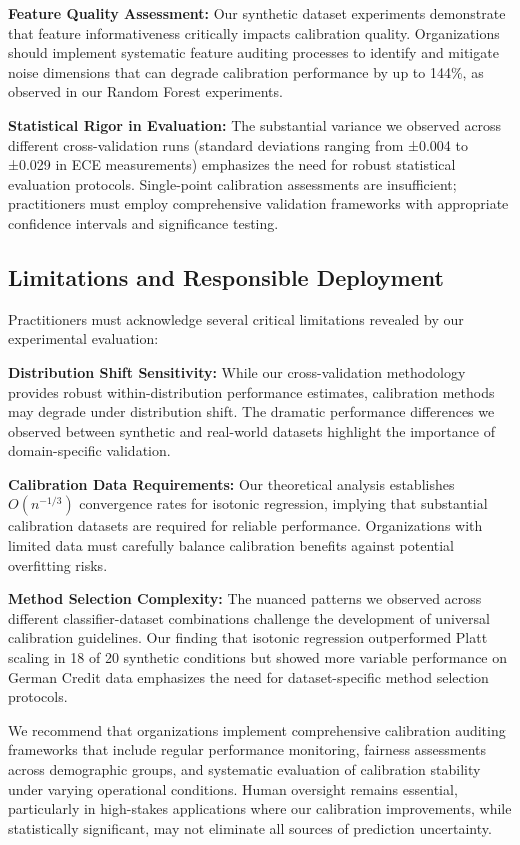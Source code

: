 \documentclass[12pt, a4paper]{article}
\begin{document}
\textbf{Feature Quality Assessment:} Our synthetic dataset experiments demonstrate that feature informativeness critically impacts calibration quality. Organizations should implement systematic feature auditing processes to identify and mitigate noise dimensions that can degrade calibration performance by up to 144\%, as observed in our Random Forest experiments.

\textbf{Statistical Rigor in Evaluation:} The substantial variance we observed across different cross-validation runs (standard deviations ranging from ±0.004 to ±0.029 in ECE measurements) emphasizes the need for robust statistical evaluation protocols. Single-point calibration assessments are insufficient; practitioners must employ comprehensive validation frameworks with appropriate confidence intervals and significance testing.

\subsection{Limitations and Responsible Deployment}

Practitioners must acknowledge several critical limitations revealed by our experimental evaluation:

\textbf{Distribution Shift Sensitivity:} While our cross-validation methodology provides robust within-distribution performance estimates, calibration methods may degrade under distribution shift. The dramatic performance differences we observed between synthetic and real-world datasets highlight the importance of domain-specific validation.

\textbf{Calibration Data Requirements:} Our theoretical analysis establishes $O(n^{-1/3})$ convergence rates for isotonic regression, implying that substantial calibration datasets are required for reliable performance. Organizations with limited data must carefully balance calibration benefits against potential overfitting risks.

\textbf{Method Selection Complexity:} The nuanced patterns we observed across different classifier-dataset combinations challenge the development of universal calibration guidelines. Our finding that isotonic regression outperformed Platt scaling in 18 of 20 synthetic conditions but showed more variable performance on German Credit data emphasizes the need for dataset-specific method selection protocols.

We recommend that organizations implement comprehensive calibration auditing frameworks that include regular performance monitoring, fairness assessments across demographic groups, and systematic evaluation of calibration stability under varying operational conditions. Human oversight remains essential, particularly in high-stakes applications where our calibration improvements, while statistically significant, may not eliminate all sources of prediction uncertainty.
\end{document}
